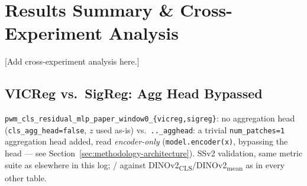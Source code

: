 \section{Results Summary \& Cross-Experiment Analysis}
\label{sec:results-summary}

[Add cross-experiment analysis here.]

\subsection{VICReg vs.\ SigReg: Agg Head Bypassed}
\label{sec:results-summary-vicreg-sigreg}

\texttt{pwm\_cls\_residual\_mlp\_paper\_window0\_\{vicreg,sigreg\}}: no aggregation head
(\texttt{cls\_agg\_head=false}, $z$ used as-is) vs.\ \texttt{..\_agghead}: a trivial
\texttt{num\_patches=1} aggregation head added, read \emph{encoder-only}
(\texttt{model.encoder(x)}, bypassing the head --- see
Section~\ref{sec:methodology-architecture}). SSv2 validation, same metric suite as
elsewhere in this log; \good{}/\bad{} against DINOv2\textsubscript{CLS}/DINOv2\textsubscript{mean}
as in every other table.

